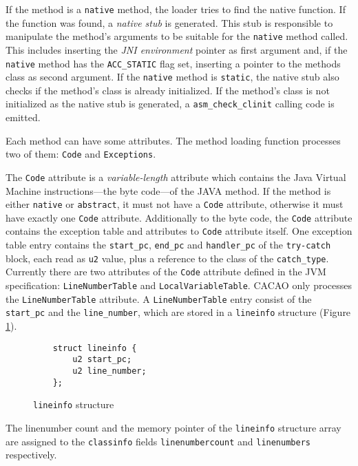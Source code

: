 If the method is a \texttt{native} method, the loader tries to find
the native function. If the function was found, a \textit{native stub}
is generated. This stub is responsible to manipulate the method's
arguments to be suitable for the \texttt{native} method called. This
includes inserting the \textit{JNI environment} pointer as first
argument and, if the \texttt{native} method has the
\texttt{ACC\_STATIC} flag set, inserting a pointer to the methods
class as second argument. If the \texttt{native} method is
\texttt{static}, the native stub also checks if the method's class is
already initialized. If the method's class is not initialized as the
native stub is generated, a \texttt{asm\_check\_clinit} calling code
is emitted.

Each method can have some attributes. The method loading function
processes two of them: \texttt{Code} and \texttt{Exceptions}.

The \texttt{Code} attribute is a \textit{variable-length} attribute
which contains the Java Virtual Machine instructions---the byte
code---of the JAVA method. If the method is either \texttt{native} or
\texttt{abstract}, it must not have a \texttt{Code} attribute,
otherwise it must have exactly one \texttt{Code}
attribute. Additionally to the byte code, the \texttt{Code} attribute
contains the exception table and attributes to \texttt{Code} attribute
itself. One exception table entry contains the \texttt{start\_pc},
\texttt{end\_pc} and
\texttt{handler\_pc} of the \texttt{try-catch} block, each read as
\texttt{u2} value, plus a reference to the class of the
\texttt{catch\_type}. Currently there are two attributes of the
\texttt{Code} attribute defined in the JVM specification:
\texttt{LineNumberTable} and \texttt{LocalVariableTable}. CACAO only
processes the \texttt{LineNumberTable} attribute. A
\texttt{LineNumberTable} entry consist of the \texttt{start\_pc} and
the \texttt{line\_number}, which are stored in a \texttt{lineinfo}
structure (Figure \ref{lineinfostructure}).

\begin{figure}[h]
\begin{verbatim}
    struct lineinfo {
        u2 start_pc;
        u2 line_number;
    };
\end{verbatim}
\caption{\texttt{lineinfo} structure}
\label{lineinfostructure}
\end{figure}

The linenumber count and the memory pointer of the \texttt{lineinfo}
structure array are assigned to the \texttt{classinfo} fields
\texttt{linenumbercount} and \texttt{linenumbers} respectively.

